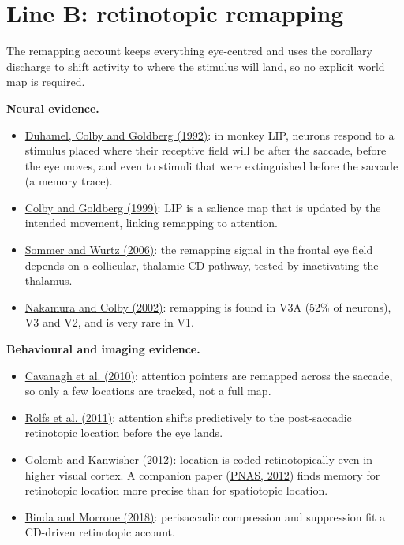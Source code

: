 \documentclass[11pt,a4paper]{article}
\begin{document}
\section{Line B: retinotopic remapping}

The remapping account keeps everything eye-centred and uses the corollary discharge to shift activity to where the stimulus will land, so no explicit world map is required.

\textbf{Neural evidence.}

\begin{itemize}[itemsep=2pt,topsep=2pt]
\item \href{https://www.science.org/doi/10.1126/science.1553535}{Duhamel, Colby and Goldberg (1992)}: in monkey LIP, neurons respond to a stimulus placed where their receptive field will be after the saccade, before the eye moves, and even to stimuli that were extinguished before the saccade (a memory trace).
\item \href{https://www.annualreviews.org/doi/10.1146/annurev.neuro.22.1.319}{Colby and Goldberg (1999)}: LIP is a salience map that is updated by the intended movement, linking remapping to attention.
\item \href{https://www.nature.com/articles/nature05279}{Sommer and Wurtz (2006)}: the remapping signal in the frontal eye field depends on a collicular, thalamic CD pathway, tested by inactivating the thalamus.
\item \href{https://doi.org/10.1073/pnas.052379899}{Nakamura and Colby (2002)}: remapping is found in V3A (52\% of neurons), V3 and V2, and is very rare in V1.
\end{itemize}

\textbf{Behavioural and imaging evidence.}

\begin{itemize}[itemsep=2pt,topsep=2pt]
\item \href{https://doi.org/10.1016/j.tics.2010.01.007}{Cavanagh et al. (2010)}: attention pointers are remapped across the saccade, so only a few locations are tracked, not a full map.
\item \href{https://www.nature.com/articles/nn.2711}{Rolfs et al. (2011)}: attention shifts predictively to the post-saccadic retinotopic location before the eye lands.
\item \href{https://doi.org/10.1093/cercor/bhr357}{Golomb and Kanwisher (2012)}: location is coded retinotopically even in higher visual cortex. A companion paper (\href{https://doi.org/10.1073/pnas.1113168109}{PNAS, 2012}) finds memory for retinotopic location more precise than for spatiotopic location.
\item \href{https://www.annualreviews.org/content/journals/10.1146/annurev-vision-091517-034317}{Binda and Morrone (2018)}: perisaccadic compression and suppression fit a CD-driven retinotopic account.
\end{itemize}
\end{document}
